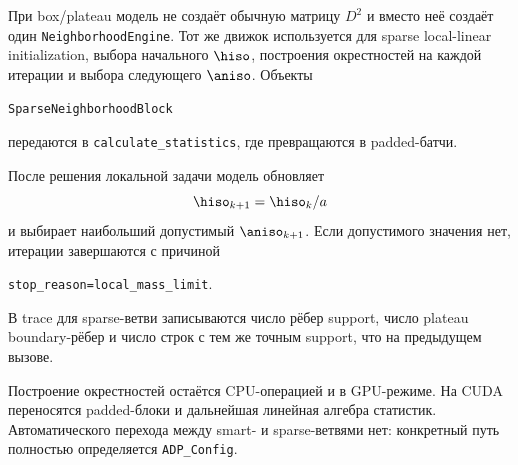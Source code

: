 При box/plateau модель не создаёт обычную матрицу $D^2$ и вместо неё
создаёт один \texttt{NeighborhoodEngine}. Тот же движок используется
для sparse local-linear initialization, выбора начального $\hiso$,
построения окрестностей на каждой итерации и выбора следующего
$\aniso$. Объекты
\begin{center}
    \texttt{SparseNeighborhoodBlock}
\end{center}
передаются в \texttt{calculate\_statistics}, где превращаются в
padded-батчи.

После решения локальной задачи модель обновляет
\begin{equation}
    \hiso_{k+1}=\hiso_k/a
\end{equation}
и выбирает наибольший допустимый $\aniso_{k+1}$. Если допустимого
значения нет, итерации завершаются с причиной
\begin{center}
    \texttt{stop\_reason=local\_mass\_limit}.
\end{center}
В trace для sparse-ветви
записываются число рёбер support, число plateau boundary-рёбер и
число строк с тем же точным support, что на предыдущем вызове.

Построение окрестностей остаётся CPU-операцией и в GPU-режиме.
На CUDA переносятся padded-блоки и дальнейшая линейная алгебра
статистик. Автоматического перехода между smart- и sparse-ветвями
нет: конкретный путь полностью определяется \texttt{ADP\_Config}.

